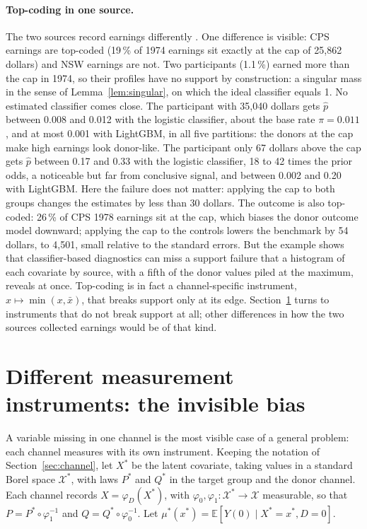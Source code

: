 \documentclass[twoside,11pt]{article}
\newcommand{\E}{\mathbb{E}}
\newcommand{\X}{\mathcal{X}}
\theoremstyle{plain}
\theoremstyle{definition}
\begin{document}
\paragraph{Top-coding in one source.} The two sources record earnings differently \citep{smith2005}. One difference is visible: CPS earnings are top-coded (19\,\% of 1974 earnings sit exactly at the cap of 25{,}862 dollars) and NSW earnings are not. Two participants (1.1\,\%) earned more than the cap in 1974, so their profiles have no support by construction: a singular mass in the sense of Lemma~\ref{lem:singular}, on which the ideal classifier equals 1. No estimated classifier comes close. The participant with 35{,}040 dollars gets $\hat p$ between 0.008 and 0.012 with the logistic classifier, about the base rate $\pi=0.011$, and at most 0.001 with LightGBM, in all five partitions: the donors at the cap make high earnings look donor-like. The participant only 67 dollars above the cap gets $\hat p$ between 0.17 and 0.33 with the logistic classifier, 18 to 42 times the prior odds, a noticeable but far from conclusive signal, and between 0.002 and 0.20 with LightGBM. Here the failure does not matter: applying the cap to both groups changes the estimates by less than 30 dollars. The outcome is also top-coded: 26\,\% of CPS 1978 earnings sit at the cap, which biases the donor outcome model downward; applying the cap to the controls lowers the benchmark by 54 dollars, to 4{,}501, small relative to the standard errors. But the example shows that classifier-based diagnostics can miss a support failure that a histogram of each covariate by source, with a fifth of the donor values piled at the maximum, reveals at once. Top-coding is in fact a channel-specific instrument, $x\mapsto\min(x,\bar x)$, that breaks support only at its edge. Section~\ref{sec:instruments} turns to instruments that do not break support at all; other differences in how the two sources collected earnings would be of that kind.
\section{Different measurement instruments: the invisible bias}\label{sec:instruments}

A variable missing in one channel is the most visible case of a general problem: each channel measures with its own instrument. Keeping the notation of Section~\ref{sec:channel}, let $X^*$ be the latent covariate, taking values in a standard Borel space $\X^*$, with laws $P^*$ and $Q^*$ in the target group and the donor channel. Each channel records $X=\varphi_D(X^*)$, with $\varphi_0,\varphi_1\colon\X^*\to\X$ measurable, so that $P=P^*\circ\varphi_1^{-1}$ and $Q=Q^*\circ\varphi_0^{-1}$. Let $\mu^*(x^*)=\E[Y(0)\mid X^*=x^*,D=0]$.
\end{document}
